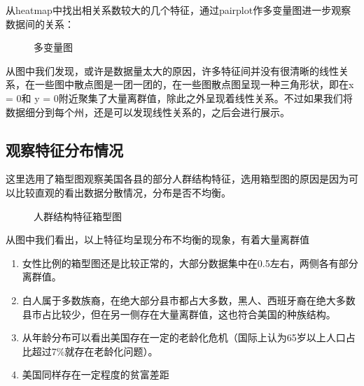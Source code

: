 \documentclass[
12pt, %
UTF8
]{fphw}
\begin{document}
	从heatmap中找出相关系数较大的几个特征，通过pairplot作多变量图进一步观察数据间的关系：
	\begin{figure}[H]
	\caption{多变量图}
	\end{figure}
	从图中我们发现，或许是数据量太大的原因，许多特征间并没有很清晰的线性关系，在一些图中散点图是一团一团的，在一些图散点图呈现一种三角形状，即在x = 0和 y = 0附近聚集了大量离群值，除此之外呈现着线性关系。不过如果我们将数据细分到每个州，还是可以发现线性关系的，之后会进行展示。
	\subsection{观察特征分布情况}
	这里选用了箱型图观察美国各县的部分人群结构特征，选用箱型图的原因是因为可以比较直观的看出数据分散情况，分布是否不均衡。
	\begin{figure}[H]
	\caption{人群结构特征箱型图}
	\end{figure}
	从图中我们看出，以上特征均呈现分布不均衡的现象，有着大量离群值
	\begin{enumerate}
		\item 女性比例的箱型图还是比较正常的，大部分数据集中在0.5左右，两侧各有部分离群值。
		\item 白人属于多数族裔，在绝大部分县市都占大多数，黑人、西班牙裔在绝大多数县市占比较少，但在另一侧存在大量离群值，这也符合美国的种族结构。
		\item 从年龄分布可以看出美国存在一定的老龄化危机（国际上认为65岁以上人口占比超过7\%就存在老龄化问题）。
		\item 美国同样存在一定程度的贫富差距
	\end{enumerate}
\end{document}
